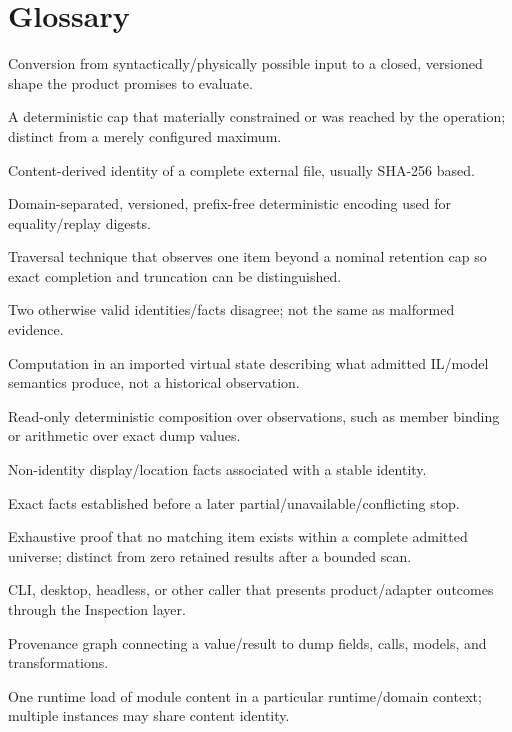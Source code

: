 \documentclass[11pt,oneside,openany]{book}
\begin{document}
\chapter{Glossary}
\label{app:glossary}

\begin{description}[style=nextline,leftmargin=35mm]
  \item[Admission] Conversion from syntactically/physically possible input to a closed, versioned shape the product promises to evaluate.
  \item[Applied bound] A deterministic cap that materially constrained or was reached by the operation; distinct from a merely configured maximum.
  \item[Artifact identity] Content-derived identity of a complete external file, usually SHA-256 based.
  \item[Canonical bytes] Domain-separated, versioned, prefix-free deterministic encoding used for equality/replay digests.
  \item[Cap-plus-one] Traversal technique that observes one item beyond a nominal retention cap so exact completion and truncation can be distinguished.
  \item[Conflict] Two otherwise valid identities/facts disagree; not the same as malformed evidence.
  \item[Counterfactual] Computation in an imported virtual state describing what admitted IL/model semantics produce, not a historical observation.
  \item[Derived query] Read-only deterministic composition over observations, such as member binding or arithmetic over exact dump values.
  \item[Descriptor] Non-identity display/location facts associated with a stable identity.
  \item[Evidence prefix] Exact facts established before a later partial/unavailable/conflicting stop.
  \item[Exact absence] Exhaustive proof that no matching item exists within a complete admitted universe; distinct from zero retained results after a bounded scan.
  \item[Host] CLI, desktop, headless, or other caller that presents product/adapter outcomes through the Inspection layer.
  \item[Lineage] Provenance graph connecting a value/result to dump fields, calls, models, and transformations.
  \item[Module instance] One runtime load of module content in a particular runtime/domain context; multiple instances may share content identity.

\end{description}
\end{document}
